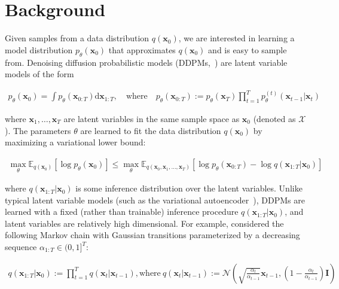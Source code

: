 \section{Background}
\label{sec:background}

Given samples from a data distribution $q({\bm{x}}_0)$, we are interested in learning a model distribution $p_\theta({\bm{x}}_0)$ that approximates $q({\bm{x}}_0)$ and is easy to sample from. Denoising diffusion probabilistic models (DDPMs,~\citet{sohl-dickstein2015deep,ho2020denoising}) are latent variable models of the form

\begin{align}
    p_\theta({\bm{x}}_0) = \int p_\theta({\bm{x}}_{0:T}) \mathrm{d} {\bm{x}}_{1:T}, \quad \text{where} \quad  p_\theta({\bm{x}}_{0:T}) := p_\theta({\bm{x}}_T) \prod_{t=1}^{T} p^{(t)}_\theta({\bm{x}}_{t-1} | {\bm{x}}_t) \label{eq:gen}
\end{align}

where ${\bm{x}}_1, \ldots, {\bm{x}}_T$ are latent variables in the same sample space as ${\bm{x}}_0$ (denoted as ${\mathcal{X}}$). The parameters $\theta$ are learned to fit the data distribution $q({\bm{x}}_0)$ by maximizing a variational lower bound:

\begin{align}
    \max_\theta {\mathbb{E}}_{q({\bm{x}}_0)}[\log p_\theta({\bm{x}}_0)] \leq \max_\theta {\mathbb{E}}_{q({\bm{x}}_0, {\bm{x}}_1, \ldots, {\bm{x}}_T)}\left[\log p_\theta({\bm{x}}_{0:T}) - \log q({\bm{x}}_{1:T} | {\bm{x}}_0) \right] \label{eq:elbo}
\end{align}

where $q({\bm{x}}_{1:T} | {\bm{x}}_0)$ is some inference distribution over the latent variables. Unlike typical latent variable models (such as the variational autoencoder~\citep{rezende2014stochastic}), DDPMs are learned with a fixed (rather than trainable) inference procedure $q({\bm{x}}_{1:T} | {\bm{x}}_0)$, 
and latent variables are relatively high dimensional. For example, \citet{ho2020denoising} considered the following Markov chain with Gaussian transitions parameterized by a decreasing sequence
$\alpha_{1:T} \in (0, 1]^T$:

\begin{align}
    q({\bm{x}}_{1:T} | {\bm{x}}_0) := \prod_{t=1}^{T} q({\bm{x}}_t | {\bm{x}}_{t-1}), \text{where} \ q({\bm{x}}_t | {\bm{x}}_{t-1}) := {\mathcal{N}}\left(\sqrt{\frac{\alpha_t}{\alpha_{t-1}}} {\bm{x}}_{t-1}, \left(1 - \frac{\alpha_t}{\alpha_{t-1}}\right) {\bm{I}}\right) \label{eq:diff-ho}
\end{align}

